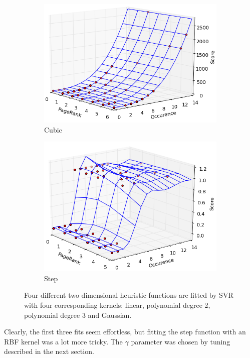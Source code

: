\documentclass[12pt,notitlepage,twoside]{scrbook}
\begin{document}
\begin{figure}[h!]
\begin{subfigure}[b]{.49\textwidth}
  \centering
  \includegraphics[width=1\linewidth]{figs/cub.png}
  \caption{Cubic}
  \label{cubic}
\end{subfigure}
\begin{subfigure}[b]{.49\textwidth}
  \centering
  \includegraphics[width=1\linewidth]{figs/step.png}
  \caption{Step}
  \label{step}
\end{subfigure}
\caption{Four different two dimensional heuristic functions are fitted by SVR with four
	corresponding kernels: linear, polynomial degree 2, polynomial degree 3 and Gaussian.\label{kernels}}
\end{figure}
Clearly, the first three fits seem effortless, but fitting the step function with an RBF
kernel was a lot more tricky. The $\gamma$ parameter was chosen by tuning described in the
next section.
\end{document}
